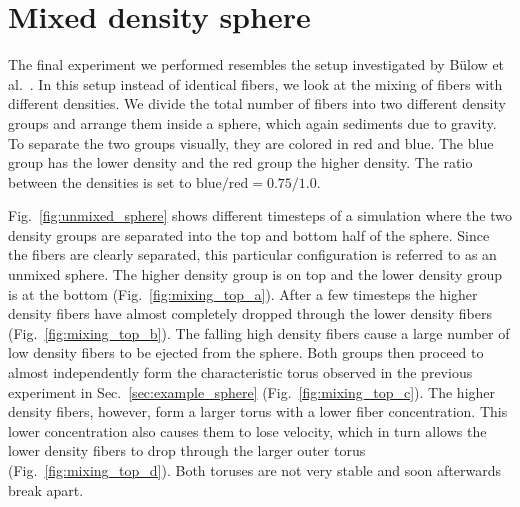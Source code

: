 \section{Mixed density sphere}
\label{sec:mixed_density_sphere}

The final experiment we performed resembles the setup investigated by Bülow et al.~\cite{Bulow2015}. In this setup instead of identical fibers, we look at the mixing of fibers with different densities. We divide the total number of fibers into two different density groups and arrange them inside a sphere, which again sediments due to gravity. To separate the two groups visually, they are colored in red and blue. The blue group has the lower density and the red group the higher density. The ratio between the densities is set to $\text{blue} / \text{red}= 0.75 / 1.0$.

Fig.~\ref{fig:unmixed_sphere} shows different timesteps of a simulation where the two density groups are separated into the top and bottom half of the sphere. Since the fibers are clearly separated, this particular configuration is referred to as an unmixed sphere. The higher density group is on top and the lower density group is at the bottom (Fig.~\ref{fig:mixing_top_a}). After a few timesteps the higher density fibers have almost completely dropped through the lower density fibers (Fig.~\ref{fig:mixing_top_b}). The falling high density fibers cause a large number of low density fibers to be ejected from the sphere. Both groups then proceed to almost independently form the characteristic torus observed in the previous experiment in Sec.~\ref{sec:example_sphere} (Fig.~\ref{fig:mixing_top_c}). The higher density fibers, however, form a larger torus with a lower fiber concentration. This lower concentration also causes them to lose velocity, which in turn allows the lower density fibers to drop through the larger outer torus (Fig.~\ref{fig:mixing_top_d}). Both toruses are not very stable and soon afterwards break apart.

